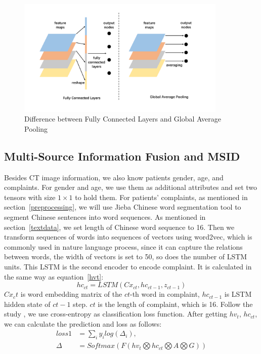 \documentclass[runningheads]{llncs}
\begin{document}
\begin{figure}[htb]
    \centerline{\includegraphics[width=100mm]{gap.pdf}}
    \vspace{-0cm}
    \caption{Difference between Fully Connected Layers and Global Average Pooling}
    \vspace{-0cm}
    \label{gap}
    \end{figure}


\subsection{Multi-Source Information Fusion and MSID}
\label{msid}
Besides CT image information, we also know patients gender, age, and complaints. For gender and age, we use them as additional attributes and set two tensors with size $1 \times 1$ to hold them. For patients' complaints, as mentioned in section~\ref{preprocessing}, we will use Jieba Chinese word segmentation tool to segment Chinese sentences into word sequences. As mentioned in section~\ref{textdata}, we set length of Chinese word sequence to 16. Then we transform sequences of words into sequences of vectors using word2vec, which is commonly used in nature language process, since it can capture the relations between words, the width of vectors is set to 50, so does the number of LSTM units. This LSTM is the second encoder to encode complaint. It is calculated in the same way as equation~\ref{hvt}:
\begin{equation}
    hc_{ct} = LSTM(Cx_{ct}, hc_{ct-1}, z_{ct-1})
    \label{hct}
\end{equation}
$Cx_ct$ is word embedding matrix of the $ct$-th word in complaint, $hc_{ct-1}$ is LSTM hidden state of $ct-1$ step. $ct$ is the length of complaint, which is 16. 
Follow the study \cite{Zreik2018A}, we use cross-entropy as classification loss function. After getting $hv_t$, $hc_{ct}$, we can calculate the prediction and loss as follows:
\begin{align*}\label{classifyandloss1}
    loss1 &= \sum_i{y_i log(\Delta_i)}, \\
    \Delta &= Softmax(F(hv_t \bigotimes hc_{ct} \bigotimes A \bigotimes G))
\end{align*}
\end{document}
